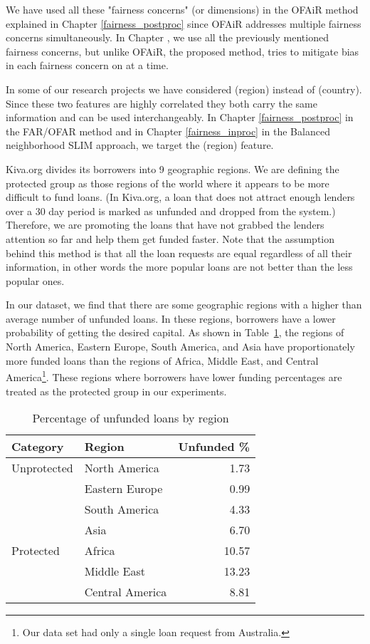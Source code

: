         We have used all these "fairness concerns" (or dimensions) in the OFAiR method explained in Chapter \ref{fairness_postproc} since OFAiR addresses multiple fairness concerns simultaneously. In Chapter , we use all the previously mentioned fairness concerns, but unlike OFAiR, the proposed method, tries to mitigate bias in each fairness concern on at a time.
        
        In some of our research projects we have considered (region) instead of (country). Since these two features are highly correlated they both carry the same information and can be used interchangeably. In Chapter \ref{fairness_postproc} in the FAR/OFAR method and in Chapter \ref{fairness_inproc} in the Balanced neighborhood SLIM approach, we target the (region) feature.
        
        Kiva.org divides its borrowers into 9 geographic regions. We are defining the protected group as those regions of the world where it appears to be more difficult to fund loans. (In Kiva.org, a loan that does not attract enough lenders over a 30 day period is marked as unfunded and dropped from the system.) Therefore, we are promoting the loans that have not grabbed the lenders attention so far and help them get funded faster. Note that the assumption behind this method is that all the loan requests are equal regardless of all their information, in other words the more popular loans are not better than the less popular ones.
        
        In our dataset, we find that there are some geographic regions with a higher than average number of unfunded loans. In these regions, borrowers have a lower probability of getting the desired capital. As shown in Table~\ref{tab:unfunded}, the regions of North America, Eastern Europe, South America, and Asia have proportionately more funded loans than the regions of Africa, Middle East, and Central America\footnote{Our data set had only a single loan request from Australia.}. These regions where borrowers have lower funding percentages are treated as the protected group in our experiments.
        
        \begin{table}
            \centering
        \begin{tabular}{l|l|r}
            Category & Region & Unfunded \% \\ \hline
            Unprotected & North America & 1.73 \\
            & Eastern Europe & 0.99 \\
            & South America & 4.33 \\
            & Asia & 6.70 \\ \hline
            Protected & Africa & 10.57 \\
            & Middle East & 13.23 \\
            & Central America & 8.81 \\
        \end{tabular}
            \caption{Percentage of unfunded loans by region}
            \label{tab:unfunded}
        \end{table}
 

